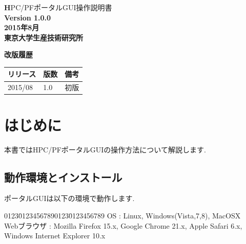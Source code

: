 \documentclass[a4paper,10pt,oneside]{jsbook}
\begin{document}
\begin{titlepage}
\vspace*{7cm}
\begin{center}%
	{\Huge \textbf HPC/PFポータルGUI操作説明書\\} 
	\vspace*{2.5cm}
	\bf Version 1.0.0\\
	\vspace*{6.5cm}
	\bf 2015年8月 \\
	\vspace{0.5cm}
	\bf 東京大学生産技術研究所\\
\end{center}
\end{titlepage}

\newpage

{\Large \bf 改版履歴}

\vspace{12pt}
\begin{tabular}{|l|l|l|} \hline
リリース & 版数 & 備考 \hspace*{11cm}\\ \hline
2015/08 & 1.0 & 初版\\ \hline
\end{tabular}

\newpage

\tableofcontents

\chapter{はじめに}
本書ではHPC/PFポータルGUIの操作方法について解説します.

\section{動作環境とインストール}
ポータルGUIは以下の環境で動作します.
\begin{tabbing}
0123\=01234567890123\=0123456789\kill
\> OS \> : Linux, Windows(Vista,7,8), MacOSX \\
\> Webブラウザ \> : Mozilla Firefox 15.x, Google Chrome 21.x, Apple Safari 6.x, Windows Internet Explorer 10.x 
\end{tabbing}
\end{document}

